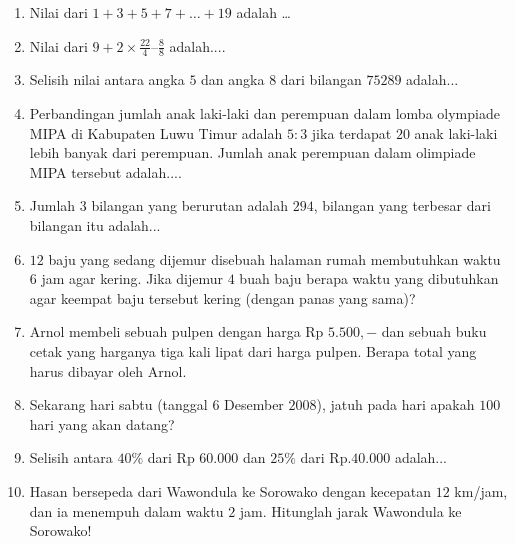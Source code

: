 \documentclass[12pt]{scrartcl}
\begin{document}
\begin{enumerate}
\item Nilai dari $1+3+5+7+\ldots+19$ adalah \dots
\item Nilai dari $9 + 2 \times \frac{22}{4} – \frac{8}{8}$ adalah....
\item Selisih nilai antara angka $5$ dan angka $8$ dari bilangan $75289$ adalah...
\item Perbandingan jumlah anak laki-laki dan perempuan dalam lomba olympiade MIPA di Kabupaten Luwu Timur adalah $5:3$ jika terdapat $20$ anak laki-laki lebih banyak dari perempuan. Jumlah anak perempuan dalam olimpiade MIPA tersebut adalah....
\item Jumlah $3$ bilangan yang berurutan adalah $294$, bilangan yang terbesar dari bilangan itu adalah...
\item $12$ baju yang sedang dijemur disebuah halaman rumah membutuhkan waktu $6$ jam agar kering. Jika dijemur $4$ buah baju berapa waktu yang dibutuhkan agar keempat baju tersebut kering (dengan panas yang sama)?
\item Arnol membeli sebuah pulpen dengan harga Rp $5.500,-$ dan sebuah buku cetak yang harganya tiga kali lipat dari harga pulpen. Berapa total yang harus dibayar oleh Arnol.
\item Sekarang hari sabtu (tanggal $6$ Desember $2008$), jatuh pada hari apakah $100$ hari yang akan datang?
\item Selisih antara $40\%$ dari Rp $60.000$ dan $25\%$ dari Rp.$40.000$ adalah...

\item Hasan bersepeda dari Wawondula ke Sorowako dengan kecepatan $12$ km/jam, dan ia menempuh dalam waktu $2$ jam. Hitunglah jarak Wawondula ke Sorowako!


\end{enumerate}
\end{document}
